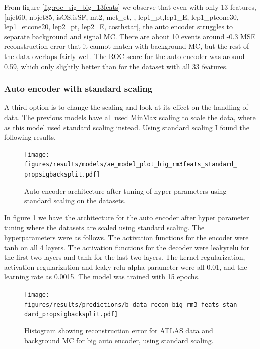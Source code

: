 \documentclass[ reprint, amsmath,amssymb, aps, nofootinbib]{revtex4-2}
\begin{document}
From figure \ref{fig:roc_sig_big_13feats} we observe that even with only 13 features, 
[njet60,  nbjet85, isOS,isSF,  mt2, met\_et,  , lep1\_pt,lep1\_E, lep1\_ptcone30, lep1\_etcone20, lep2\_pt,  lep2\_E, costhstar], the auto encoder struggles to separate background and signal MC. There are about 10 events around -0.3 MSE reconstruction error that it cannot match with background MC, but the rest of the data overlaps fairly well. The ROC score for the auto encoder was around 0.59, which only slightly better than for the dataset with all 33 features. \par

\subsubsection{Auto encoder with standard scaling}

A third option is to change the scaling and look at its effect on the handling of data. The previous models have all used MinMax scaling to scale the data, where as this model used standard scaling instead. Using standard scaling I found the following results.

\begin{figure}[H]
     \centering
         \texttt{[image: figures/results/models/ae\_model\_plot\_big\_rm3feats\_standard\_propsigbacksplit.pdf]}
         \caption{Auto encoder architecture after tuning of hyper parameters using standard scaling on the datasets. }
     \label{fig:ae_big_standard}
\end{figure}

In figure \ref{fig:ae_big_standard} we have the architecture for the auto encoder after hyper parameter tuning where the datasets are scaled using standard scaling. The hyperparameters were as follows. The activation functions for the encoder were tanh on all 4 layers. The activation functions for the decoder were leakyrelu for the first two layers and tanh for the last two layers. The kernel regularization, activation regularization and leaky relu alpha parameter were all 0.01, and the learning rate as 0.0015. The model was trained with 15 epochs.

\begin{figure}[H]
     \centering
         \texttt{[image: figures/results/predictions/b\_data\_recon\_big\_rm3\_feats\_standard\_propsigbacksplit.pdf]}
         \caption{Histogram showing reconstruction error for ATLAS data and background MC for big auto encoder, using standard scaling.}
     \label{fig:data_b_big_pred_stand}
\end{figure}
\end{document}
